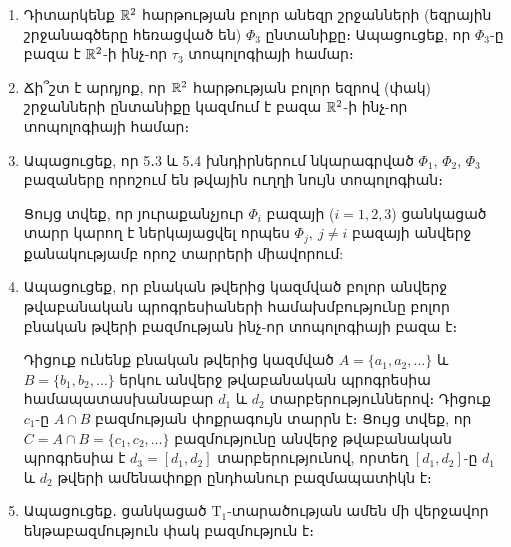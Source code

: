 \begin{enumerate}[label=\thesection.\arabic*.]
\par Ապացուցեք․ $\Phi_1$-ը և $\Phi_2$-ը ծառայում են որպես բազա $\R^2$-ի ինչ-որ $\tau_1$ և $\tau_2$ տոպոլոգիաների համար։

\begin{hint}
Դիտարկելով որևէ երկու հատվող քառակուսի առաջին ընտանի\-քից և օգտվելով խնդիր 5․2-ից՝ ստուգեք \hyperref[ch5thm2]{թեորեմ 2}-ի երկրորդ պայմանը (առա\-ջին պայմանը բավարարվում է ակնհայտորեն)։ Երկրորդ ընտանիքի դեպքը բեր\-վում է առաջին ընտանիքի դեպքին՝ կատարելով պտույտ կոորդինատների սկզբնա\-կետի շուրջը $45^\circ$-ով։
\end{hint}

\item Դիտարկենք $\R^2$ հարթության բոլոր անեզր շրջանների (եզրային շրջանագծերը հեռացված են) $\Phi_3$ ընտանիքը։ Ապացուցեք, որ $\Phi_3$-ը բազա է $\R^2$-ի ինչ-որ $\tau_3$ տոպոլոգիայի համար։

\item Ճի՞շտ է արդյոք, որ $\R^2$ հարթության բոլոր եզրով (փակ) շրջանների ընտանիքը կազմում է բազա $\R^2$-ի ինչ-որ տոպոլոգիայի համար։
 
\item Ապացուցեք, որ 5․3 և 5․4 խնդիրներում նկարագրված $\Phi_1$, $\Phi_2$, $\Phi_3$ բազաները որոշում են թվային ուղղի նույն տոպոլոգիան։

\begin{hint}
  Ցույց տվեք, որ յուրաքանչյուր $\Phi_i$ բազայի ($i=1, 2, 3$) ցանկացած տարր կարող է ներկայացվել որպես $\Phi_j,\ j \not= i$ բազայի անվերջ քանակությամբ որոշ տարրերի միավորում:
\end{hint}

\item Ապացուցեք, որ բնական թվերից կազմված բոլոր անվերջ թվաբանական \linebreak պրոգ\-րե\-սիաների համախմբությունը բոլոր բնական թվերի բազմության ինչ-որ տոպո\-լո\-գիայի բազա է։

\begin{hint}
Դիցուք ունենք բնական թվերից կազմված $A=\{a_1, a_2, \dots\}$ և $B=\{b_1, b_2, \dots\}$ երկու անվերջ թվաբանական պրոգրեսիա համապատաս\-խա\-նաբար $d_1$ և $d_2$ տարբերություններով։ Դիցուք $c_1$-ը $A\cap B$ բազմության փոք\-րա\-գույն տարրն է։ Ցույց տվեք, որ $C=A \cap B=\{c_1, c_2, \dots \}$ բազմությունը ան\-վերջ թվաբանական պրոգրեսիա է $d_3=[d_1, d_2]$ տարբերությունով, որտեղ $[d_1, d_2]$-ը $d_1$ և $d_2$ թվերի ամենափոքր ընդհանուր բազմապատիկն է։
\end{hint}

\item Ապացուցեք․ ցանկացած $\textrm{T}_1$-տարածության ամեն մի վերջավոր ենթա\-բազ\-մու\-թյուն փակ բազմություն է։


\end{enumerate}
